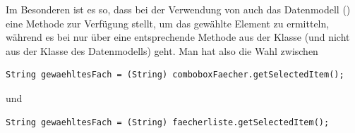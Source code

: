 \medskip
Im Besonderen ist es so, dass bei der Verwendung von  auch
das Datenmodell () eine Methode zur Verfügung
stellt, um das gewählte Element zu ermitteln, während es bei  nur
über eine entsprechende Methode aus der Klasse  (und nicht aus
der Klasse des Datenmodells) geht. Man hat also die Wahl zwischen

\begin{lstlisting}
String gewaehltesFach = (String) comboboxFaecher.getSelectedItem();
\end{lstlisting}

und

\begin{lstlisting}
String gewaehltesFach = (String) faecherliste.getSelectedItem();
\end{lstlisting}
